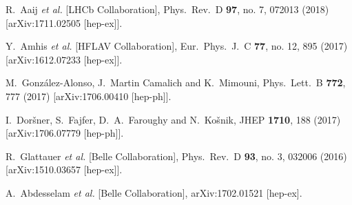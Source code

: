 \documentclass[aps,prd,superscriptaddress,twocolumn,secnumarabic]{revtex4-1}
\begin{document}
\begin{thebibliography}{99}
  R.~Aaij {\it et al.} [LHCb Collaboration],
  Phys.\ Rev.\ D {\bf 97}, no. 7, 072013 (2018)
  [arXiv:1711.02505 [hep-ex]].


  Y.~Amhis {\it et al.} [HFLAV Collaboration],
  Eur.\ Phys.\ J.\ C {\bf 77}, no. 12, 895 (2017)
  [arXiv:1612.07233 [hep-ex]].


  M.~González-Alonso, J.~Martin Camalich and K.~Mimouni,
  Phys.\ Lett.\ B {\bf 772}, 777 (2017)
  [arXiv:1706.00410 [hep-ph]].


  I.~Doršner, S.~Fajfer, D.~A.~Faroughy and N.~Košnik,
  JHEP {\bf 1710}, 188 (2017)
  [arXiv:1706.07779 [hep-ph]].


  R.~Glattauer {\it et al.} [Belle Collaboration],
  Phys.\ Rev.\ D {\bf 93}, no. 3, 032006 (2016)
  [arXiv:1510.03657 [hep-ex]].


  A.~Abdesselam {\it et al.} [Belle Collaboration],
  arXiv:1702.01521 [hep-ex].



\end{thebibliography}
\end{document}
